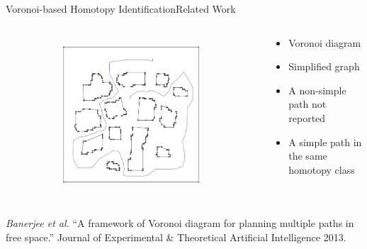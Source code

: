\begin{frame}{Voronoi-based Homotopy Identification}{Related Work}
\begin{columns}
\begin{figure}
\begin{subfigure}
\end{subfigure}
\begin{subfigure}
	\centering
	\includegraphics[width=.49\linewidth]{figure/voronoi_homotopy4}
\end{subfigure}
\end{figure}

\begin{block}{}
\begin{itemize}
\item Voronoi diagram
\item Simplified graph
\item A non-simple path not reported 
\item A simple path in the same homotopy class
\end{itemize}
\end{block}

\end{columns}

\tiny{ {\it Banerjee et al.} ``A framework of Voronoi diagram for planning multiple paths in free space.'' Journal of Experimental \& Theoretical Artificial Intelligence 2013.}

\end{frame}

